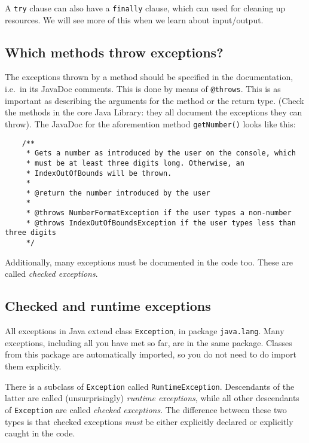 A \verb+try+ clause can also have a \verb+finally+ clause, which can
used for cleaning up resources. We will see more of this when we learn
about input/output. 

\subsection{Which methods throw exceptions?}
\label{sec:which-methods-throw}

The exceptions thrown by a method should be specified in the
documentation, i.e.~in its JavaDoc comments. This is done by means of
\verb+@throws+. This is as important as describing the arguments for
the method or the return type. (Check the methods in the core Java
Library: they all document the exceptions they can throw). The JavaDoc
for the aforemention method \verb+getNumber()+ looks like this:

\begin{verbatim}
    /**
     * Gets a number as introduced by the user on the console, which
     * must be at least three digits long. Otherwise, an 
     * IndexOutOfBounds will be thrown.
     *
     * @return the number introduced by the user
     *
     * @throws NumberFormatException if the user types a non-number
     * @throws IndexOutOfBoundsException if the user types less than three digits
     */
\end{verbatim}

Additionally, many exceptions must be documented in the code
too. These are called \emph{checked exceptions}. 

\subsection{Checked and runtime exceptions}
\label{sec:check-runt-except}

All exceptions in Java extend class \verb+Exception+, in package
\verb+java.lang+. Many exceptions, including all you have met so far,
are in the same package. Classes from this package are automatically
imported, so you do not need to do import them explicitly. 

There is a subclass of \verb+Exception+ called 
\verb+RuntimeException+. Descendants
of the latter are called (unsurprisingly) \emph{runtime exceptions},
while all other descendants of \verb+Exception+ are called
\emph{checked exceptions}. The difference between these two types is
that checked exceptions \emph{must} be either explicitly declared or
explicitly caught in the code.

